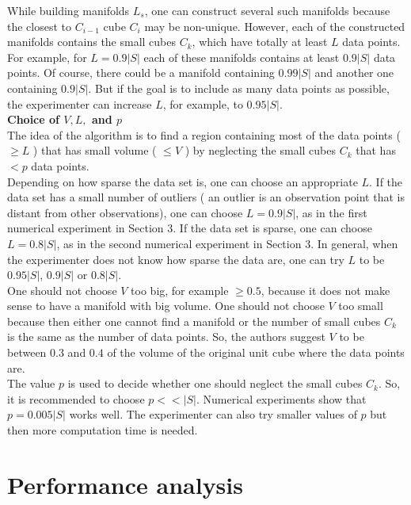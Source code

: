 \documentclass[12pt]{article}
\theoremstyle{plain}
\begin{document}
\noindent While building  manifolds $L_s$, one can construct several such manifolds because the closest to $C_{i-1}$ cube $C_i$ may be non-unique.
 However, each of the constructed manifolds contains the small cubes $C_k$, which have totally at least $L$ data points. For example, for
  $L = 0.9|S|$ each of these manifolds contains at least $0.9|S|$ data points. Of course, there could be a manifold containing $0.99 |S|$ and
   another one containing $0.9|S|$. But if the goal is to include as many data points as possible, the experimenter can increase $L$, for example,
    to $0.95|S|$.\\

\noindent \textbf{Choice of $V, L,$ and $p$}\\

\noindent The idea of the algorithm is to find a region containing most of the data points ( $\geq L$ ) that has small volume ( $\leq V$ ) by
neglecting the small cubes $C_k$ that has $< p$ data points.\\

\noindent Depending on how sparse the data set is, one can choose an appropriate $L$. If the data set has a small number of outliers ( an outlier is
an observation point that is distant from other observations), one can choose $L = 0.9 |S|$, as in the first numerical experiment in Section 3. If the
data set is sparse, one can choose $L = 0.8 |S|$, as in the second numerical experiment in Section 3. In general, when the experimenter does not know
how sparse the data are, one can try $L$ to be $0.95 |S|$, $0.9 |S|$ or $0.8|S|$.\\

\noindent One should not choose $V$ too big, for example $\geq 0.5$, because it does not make sense to have a manifold with big volume. One should not
 choose $V$ too small because then either one cannot find a manifold or the number of small cubes $C_k$ is the same as the number of data points. So,
 the authors suggest $V$ to be between $0.3$ and $0.4$ of the volume of the original unit cube where the data points are.\\

\noindent The value $p$ is used to decide whether one should neglect the small cubes $C_k$. So, it is recommended to choose  $p<<|S|$. Numerical
experiments show that $p = 0.005|S|$ works well. The experimenter can also try smaller values of $p$ but then more computation time is needed.

\noindent

\section{Performance analysis}\label{Performance analysis}
\end{document}

